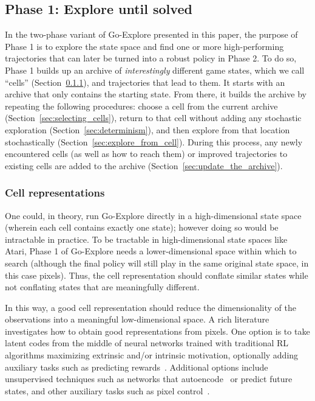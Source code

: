 \documentclass{article}
\begin{document}
\subsection{Phase 1: Explore until solved}

In the two-phase variant of Go-Explore presented in this paper, the purpose of Phase 1 is to explore the state space and find one or more high-performing trajectories that can later be turned into a robust policy in Phase 2. To do so, Phase 1 builds up an archive of \emph{interestingly} different game states, which we call ``cells'' (Section~\ref{sec:cell_representations}), and trajectories that lead to them. It starts with an archive that only contains the starting state.
From there, it builds the archive by repeating the following procedures: choose a cell from the current archive (Section~\ref{sec:selecting_cells}), return to that cell without adding any stochastic exploration (Section~\ref{sec:determinism}), and then explore from that location stochastically (Section~\ref{sec:explore_from_cell}). During this process, any newly encountered cells (as well as how to reach them) or improved trajectories to existing cells are added to the archive (Section~\ref{sec:update_the_archive}).


\subsubsection{Cell representations}
\label{sec:cell_representations}
\label{sec:no_domain_knowledge_representation}
\label{sec:domain_knowledge_representation}

One could, in theory, run Go-Explore directly in a high-dimensional state space (wherein each cell contains exactly one state); however doing so would be intractable in practice. To be tractable in high-dimensional state spaces like Atari, Phase 1 of Go-Explore needs a lower-dimensional space within which to search (although the final policy will still play in the same original state space, in this case pixels). Thus, the cell representation should conflate similar states while not conflating states that are meaningfully different.

In this way, a good cell representation should reduce the dimensionality of the observations into a meaningful low-dimensional space. A rich literature investigates how to obtain good representations from pixels. One option is to take latent codes from the middle of neural networks trained with traditional RL algorithms maximizing extrinsic and/or intrinsic motivation, optionally adding auxiliary tasks such as predicting rewards~\cite{Silver2017ThePE}. 
Additional options include unsupervised techniques such as networks that autoencode~\cite{lange2010deep} or predict future states, and other auxiliary tasks such as pixel control~\cite{Jaderberg2016ReinforcementLW}. 
\end{document}
